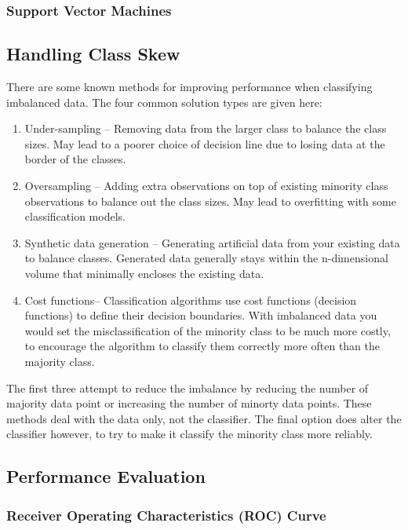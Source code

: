 \documentclass{article}
\begin{document}
\subsubsection{Support Vector Machines}

\subsection{Handling Class Skew}
There are some known methods for improving performance when classifying imbalanced data. The four common solution types are given here:
\begin{enumerate}
\item Under-sampling -- Removing data from the larger class to balance the class sizes.
May lead to a poorer choice of decision line due to losing data at the border of the classes.
\item Oversampling -- Adding extra observations on top of existing minority class observations to balance out the class sizes.
May lead to overfitting with some classification models.
\item Synthetic data generation -- Generating artificial data from your existing data to balance classes.
Generated data generally stays within the n-dimensional volume that minimally encloses the existing data.
\item Cost functions-- Classification algorithms use cost functions (decision functions) to define their decision boundaries.
With imbalanced data you would set the misclassification of the minority class to be much more costly, to encourage the algorithm to classify them correctly more often than the majority class.
\end{enumerate}
The first three attempt to reduce the imbalance by reducing the number of majority data point or increasing the number of minorty data points.
These methods deal with the data only, not the classifier.
The final option does alter the classifier however, to try to make it classify the minority class more reliably.

\subsection{Performance Evaluation}

\subsubsection{Receiver Operating Characteristics (ROC) Curve}
\end{document}
